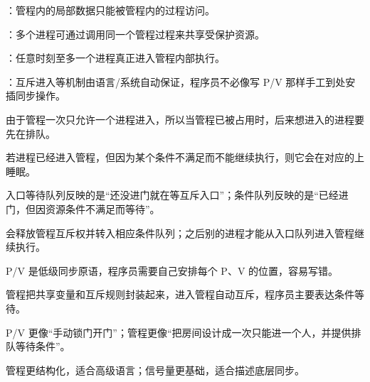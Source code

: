 \begin{points}
  \item {}：管程内的局部数据只能被管程内的过程访问。
  \item {}：多个进程可通过调用同一个管程过程来共享受保护资源。
  \item {}：任意时刻至多一个进程真正进入管程内部执行。
  \item {}：互斥进入等机制由语言/系统自动保证，程序员不必像写 P/V 那样手工到处安插同步操作。
\end{points}


\begin{points}
  \item 由于管程一次只允许一个进程进入，所以当管程已被占用时，后来想进入的进程要先在排队。
  \item 若进程已经进入管程，但因为某个条件不满足而不能继续执行，则它会在对应的上睡眠。
  \item 入口等待队列反映的是“还没进门就在等互斥入口”；条件队列反映的是“已经进门，但因资源条件不满足而等待”。
  \item {} 会释放管程互斥权并转入相应条件队列；之后别的进程才能从入口队列进入管程继续执行。
\end{points}


\begin{points}
  \item P/V 是低级同步原语，程序员需要自己安排每个 P、V 的位置，容易写错。
  \item 管程把共享变量和互斥规则封装起来，进入管程自动互斥，程序员主要表达条件等待。
  \item P/V 更像“手动锁门开门”；管程更像“把房间设计成一次只能进一个人，并提供排队等待条件”。
  \item 管程更结构化，适合高级语言；信号量更基础，适合描述底层同步。
\end{points}



